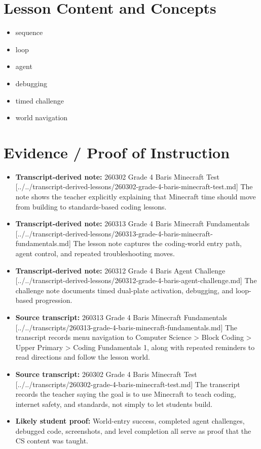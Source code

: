 \documentclass[11pt]{article}
\begin{document}
\section*{Lesson Content and Concepts}
\begin{itemize}[leftmargin=*]
\item sequence
\item loop
\item agent
\item debugging
\item timed challenge
\item world navigation
\end{itemize}

\section*{Evidence / Proof of Instruction}
\begin{itemize}[leftmargin=*]
\item \textbf{Transcript-derived note:} 260302 Grade 4 Baris Minecraft Test [../../transcript-derived-lessons/260302-grade-4-baris-minecraft-test.md] The note shows the teacher explicitly explaining that Minecraft time should move from building to standards-based coding lessons.
\item \textbf{Transcript-derived note:} 260313 Grade 4 Baris Minecraft Fundamentals [../../transcript-derived-lessons/260313-grade-4-baris-minecraft-fundamentals.md] The lesson note captures the coding-world entry path, agent control, and repeated troubleshooting moves.
\item \textbf{Transcript-derived note:} 260312 Grade 4 Baris Agent Challenge [../../transcript-derived-lessons/260312-grade-4-baris-agent-challenge.md] The challenge note documents timed dual-plate activation, debugging, and loop-based progression.
\item \textbf{Source transcript:} 260313 Grade 4 Baris Minecraft Fundamentals [../../transcripts/260313-grade-4-baris-minecraft-fundamentals.md] The transcript records menu navigation to Computer Science > Block Coding > Upper Primary > Coding Fundamentals 1, along with repeated reminders to read directions and follow the lesson world.
\item \textbf{Source transcript:} 260302 Grade 4 Baris Minecraft Test [../../transcripts/260302-grade-4-baris-minecraft-test.md] The transcript records the teacher saying the goal is to use Minecraft to teach coding, internet safety, and standards, not simply to let students build.
\item \textbf{Likely student proof:} World-entry success, completed agent challenges, debugged code, screenshots, and level completion all serve as proof that the CS content was taught.
\end{itemize}
\end{document}
